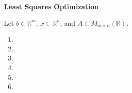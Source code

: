 \textbf{Least Squares Optimization}

Let $b \in \mathbb{R}^m$, $x \in \mathbb{R}^n$, and $A \in M_{m \times n}(\mathbb{R})$.

\begin{enumerate}
    \item 
    \item 
    \pagebreak
    \item 
    \item 
    \pagebreak
    \item 
    \item 
\end{enumerate}